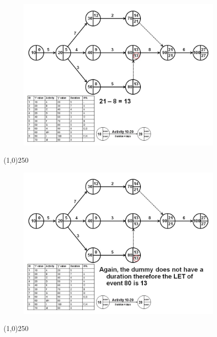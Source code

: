 \begin{frame}
\begin{figure}
	\centering
		\includegraphics[width = 10.0cm]{oldnotes/Slide114.jpg}
\end{figure}
\end{frame}
\begin{center}\line(1,0){250}\end{center}


\begin{frame}
\begin{figure}
	\centering
		\includegraphics[width = 10.0cm]{oldnotes/Slide115.jpg}
\end{figure}
\end{frame}
\begin{center}\line(1,0){250}\end{center}


